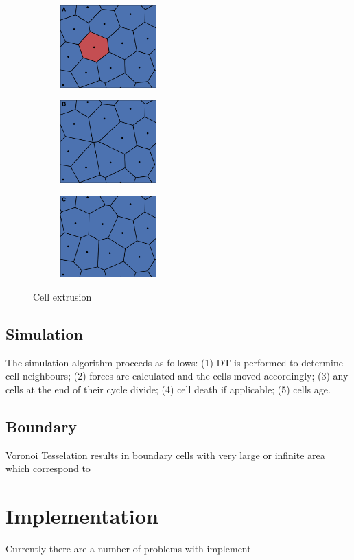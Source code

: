 \documentclass[a4paper]{article}
\begin{document}
\begin{figure}[htbp]
\centering
\begin{subfigure}{0.24\textwidth}
	\centering
	\includegraphics[width=3.7cm]{dead_1.png}
	\label{fig:divideA}
\end{subfigure} \hspace{0.02cm}
\centering
\begin{subfigure}{0.24\textwidth}
	\centering
	\includegraphics[width=3.7cm]{dead_2.png}
	\label{fig:divideA}
\end{subfigure} \hspace{0.02cm}
\centering
\begin{subfigure}{0.24\textwidth}
	\centering
	\includegraphics[width=3.7cm]{dead_3.png}
	\label{fig:divideA}
\end{subfigure}
\caption{Cell extrusion}
\label{fig:manmade}
\end{figure}

\subsection{Simulation}
The simulation algorithm proceeds as follows: (1) DT is performed to determine cell neighbours; (2) forces are calculated and the cells moved accordingly; (3) any cells at the end of their cycle divide; (4) cell death if applicable; (5) cells age.

\subsection{Boundary}
Voronoi Tesselation results in boundary cells with very large or infinite area which correspond to

\section{Implementation}
Currently there are a number of problems with implement
 
 

\end{document}

